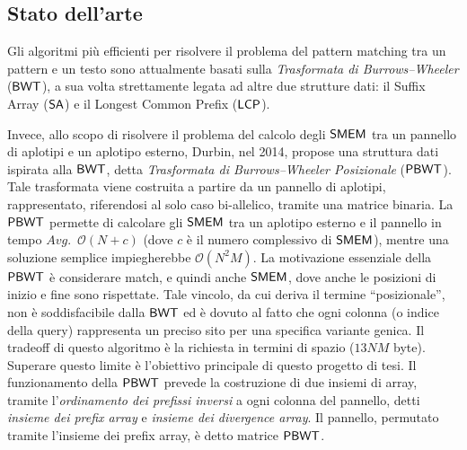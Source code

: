 \documentclass[a4paper,11pt, oneside,italian]{article}
\def\SA{\mbox{\rm {\sf SA}}}
\def\LCP{\mbox{\rm {\sf LCP}}}
\def\LCP{\mbox{\rm {\sf LCP}}}
\def\BWT{\mbox{\rm {\sf BWT}}}
\def\PBWT{\mbox{\rm {\sf PBWT}}}
\def\SMEM{\mbox{\rm {\sf SMEM}}}
\begin{document}
\subsection*{Stato dell'arte}
Gli algoritmi più efficienti per risolvere il problema del pattern matching tra
un pattern e un testo 
sono attualmente basati sulla \emph{Trasformata di Burrows--Wheeler} ($\BWT$), a
sua 
volta strettamente legata ad altre due strutture dati: il Suffix Array ($\SA$) e
il Longest Common Prefix ($\LCP$). 

Invece, allo scopo di risolvere il problema del calcolo degli $\SMEM$ tra un
pannello di aplotipi e un aplotipo esterno,
Durbin, nel 2014, propose una struttura dati ispirata alla $\BWT$, detta
\textit{Trasformata di Burrows--Wheeler Posizionale} ($\PBWT$). Tale trasformata
viene costruita a partire da un pannello di aplotipi, rappresentato, riferendosi
al solo caso bi-allelico, tramite una matrice binaria.
La $\PBWT$ permette di calcolare gli $\SMEM$ tra
un aplotipo esterno e il pannello in tempo $Avg.\,\,\,\mathcal{O}(N+c)$ (dove 
$c$ è il numero complessivo di $\SMEM$), mentre 
una soluzione semplice impiegherebbe $\mathcal{O}(N^2M)$.
La motivazione essenziale della $\PBWT$ è considerare match, e quindi anche
$\SMEM$, 
dove anche le posizioni di inizio e fine sono rispettate.
Tale vincolo, da cui deriva il termine
``posizionale'', non è soddisfacibile dalla $\BWT$ ed è dovuto al fatto che ogni 
colonna (o indice della query) rappresenta un preciso sito per una specifica
variante genica. Il tradeoff di questo algoritmo è la richiesta in termini di
spazio ($13NM$ 
byte). Superare questo limite è l'obiettivo principale di
questo progetto di tesi.
Il funzionamento della $\PBWT$ prevede la costruzione di due insiemi di
array, tramite 
l'\textit{ordinamento dei prefissi inversi} a ogni colonna del pannello, detti
\textit{insieme dei prefix array} e \textit{insieme dei divergence array}.
Il pannello, permutato tramite l'insieme dei prefix array, è
detto matrice $\PBWT$.
\end{document}
